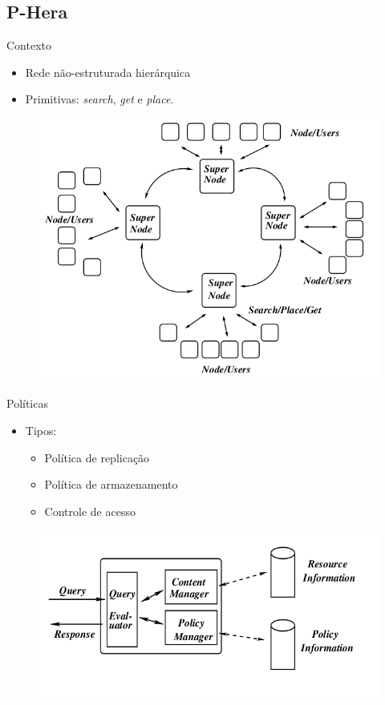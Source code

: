 \documentclass{beamer}
\begin{document}
\subsection{P-Hera}
  \begin{frame}{Contexto}
   \begin{itemize}
    \item Rede não-estruturada hierárquica
    \item Primitivas: \textit{search}, \textit{get} e \textit{place}.
   \end{itemize}
   \begin{figure}[H]
      \includegraphics[scale=0.25]{phera_fig1.png}
   \end{figure}

  \end{frame}
  
  \begin{frame}{Políticas}
   \begin{itemize}
    \item Tipos:
    \begin{itemize}
     \item Política de replicação
     \item Política de armazenamento
     \item Controle de acesso
    \end{itemize}
   \end{itemize}
   \begin{figure}[H]
    \includegraphics[scale=0.25]{phera_fig2.png}
   \end{figure}

  \end{frame}
  
\end{document}
